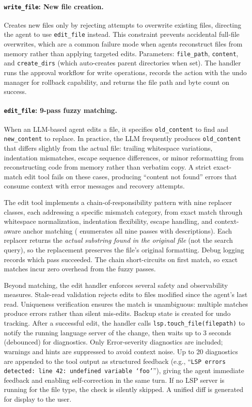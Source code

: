 \paragraph{\texttt{write\_file}: New file creation.} Creates new files only by rejecting attempts to overwrite existing files, directing the agent to use \texttt{edit\_file} instead. This constraint prevents accidental full-file overwrites, which are a common failure mode when agents reconstruct files from memory rather than applying targeted edits. Parameters: \texttt{file\_path}, \texttt{content}, and \texttt{create\_dirs} (which auto-creates parent directories when set). The handler runs the approval workflow for write operations, records the action with the undo manager for rollback capability, and returns the file path and byte count on success.

\paragraph{\texttt{edit\_file}: 9-pass fuzzy matching.} When an LLM-based agent edits a file, it specifies \texttt{old\_content} to find and \texttt{new\_content} to replace. In practice, the LLM frequently produces \texttt{old\_content} that differs slightly from the actual file: trailing whitespace variations, indentation mismatches, escape sequence differences, or minor reformatting from reconstructing code from memory rather than verbatim copy. A strict exact-match edit tool fails on these cases, producing ``content not found'' errors that consume context with error messages and recovery attempts.

The edit tool implements a chain-of-responsibility pattern with nine replacer classes, each addressing a specific mismatch category, from exact match through whitespace normalization, indentation flexibility, escape handling, and context-aware anchor matching ( enumerates all nine passes with descriptions). Each replacer returns the \emph{actual substring found in the original file} (not the search query), so the replacement preserves the file's original formatting. Debug logging records which pass succeeded. The chain short-circuits on first match, so exact matches incur zero overhead from the fuzzy passes.

Beyond matching, the edit handler enforces several safety and observability measures. Stale-read validation rejects edits to files modified since the agent's last read. Uniqueness verification ensures the match is unambiguous: multiple matches produce errors rather than silent mis-edits. Backup state is created for undo tracking. After a successful edit, the handler calls \texttt{lsp.touch\_file(filepath)} to notify the running language server of the change, then waits up to 3 seconds (debounced) for diagnostics. Only Error-severity diagnostics are included; warnings and hints are suppressed to avoid context noise. Up to 20 diagnostics are appended to the tool output as structured feedback (e.g., ``\texttt{LSP errors detected: line 42: undefined variable `foo'}''), giving the agent immediate feedback and enabling self-correction in the same turn. If no LSP server is running for the file type, the check is silently skipped. A unified diff is generated for display to the user.


